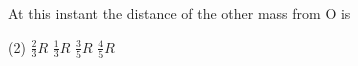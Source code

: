 
    \item At this instant the distance of the other mass from O is
        \begin{center}
        \end{center}
        \begin{tasks}(2)
            \task \(\frac{2}{3}R\)
            \task \(\frac{1}{3}R\)
            \task \(\frac{3}{5}R\)
            \task \(\frac{4}{5}R\)
        \end{tasks}



